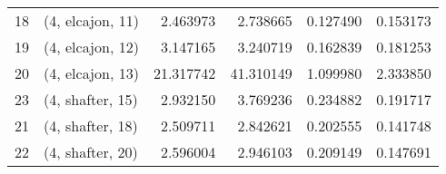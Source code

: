 \begin{tabular}{llrrrr}
18 &  (4, elcajon, 11) &   2.463973 &   2.738665 &   0.127490 &  0.153173 \\
19 &  (4, elcajon, 12) &   3.147165 &   3.240719 &   0.162839 &  0.181253 \\
20 &  (4, elcajon, 13) &  21.317742 &  41.310149 &   1.099980 &  2.333850 \\
23 &  (4, shafter, 15) &   2.932150 &   3.769236 &   0.234882 &  0.191717 \\
21 &  (4, shafter, 18) &   2.509711 &   2.842621 &   0.202555 &  0.141748 \\
22 &  (4, shafter, 20) &   2.596004 &   2.946103 &   0.209149 &  0.147691 \\
\bottomrule
\end{tabular}

